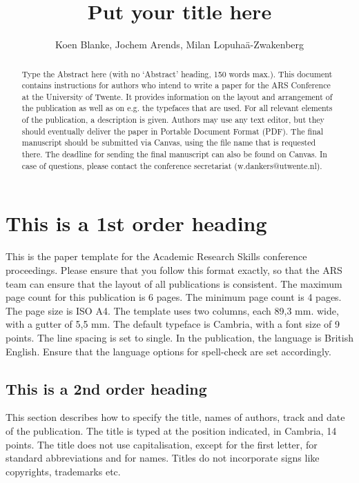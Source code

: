 \documentclass{paper}
\title{Put your title here}
\author{Koen Blanke, Jochem Arends, Milan Lopuhaä-Zwakenberg}
\begin{document}
\maketitle

\begin{abstract}

Type the Abstract here (with no ‘Abstract’ heading, 150 words max.).
This document contains instructions for authors who intend to write a paper for the ARS Conference at the University of Twente.
It provides information on the layout and arrangement of the publication as well as on e.g. the typefaces that are used.
For all relevant elements of the publication, a description is given.
Authors may use any text editor, but they should eventually deliver the paper in Portable Document Format (PDF).
The final manuscript should be submitted via
Canvas, using the file name that is requested there.
The deadline for sending the final manuscript can also be found on Canvas.
In case of questions, please contact the conference secretariat (w.dankers@utwente.nl).

\end{abstract}

\section{This is a 1st order heading}

This is the paper template for the Academic Research Skills conference proceedings.
Please ensure that you follow this format exactly, so that the ARS team can ensure that the layout of all publications is consistent.
The maximum page count for this publication is 6 pages.
The minimum page count is 4 pages.
The page size is ISO A4.
The template uses two columns, each 89,3 mm.
wide, with a gutter of 5,5 mm.
The default typeface is Cambria, with a font size of 9 points.
The line spacing is set to single.
In the publication, the language is British English.
Ensure that the language options for spell-check are set accordingly.

\subsection{This is a 2nd order heading}

This section describes how to specify the title, names of authors, track and date of the publication.
The title is typed at the position indicated, in Cambria, 14 points.
The title does not use capitalisation, except for the first letter, for standard abbreviations and for names.
Titles do not incorporate signs like copyrights, trademarks etc.
\end{document}
